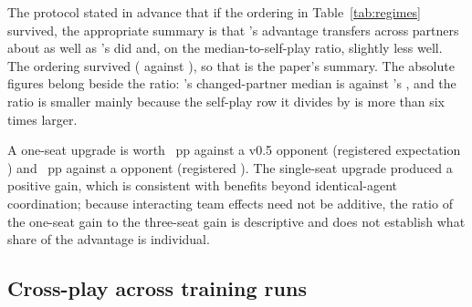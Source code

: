 \begin{table}[!ht]\centering
\caption{Partner-regime table against a \vsix{} opponent. Per-bank values are given in bank order,
7090001 then 7090002.}
\label{tab:partnerssix}
{\tabfont}
\end{table}

\begin{table}[!ht]\centering
\caption{Transfer across partners: \sestina{} over \vsix{} against \vsix{} over v0.5, on the same
eight settings and the same banks. The two training rows are quoted from the registered
protocol; the protocol records that its v0.6-over-v0.5
training row is computed on three of seven changed settings, so that row is not directly comparable
with the holdout row above it. Reported and not gated.}
\label{tab:regimes}
{\tabfont}
\end{table}

The protocol stated in advance that if the ordering in Table~\ref{tab:regimes} survived, the
appropriate summary is that \sestina{}'s advantage transfers across partners about as well as
\vsix{}'s did and, on the median-to-self-play ratio, slightly less well. The ordering survived
(\vsevenSoneRatio{} against \vsevenBaseRatio{}), so that is the paper's summary. The absolute
figures belong beside the ratio: \sestina{}'s changed-partner median is \vsevenSoneMedian{}
against \vsix{}'s \vsevenBaseMedian{}, and the ratio is smaller mainly because the self-play row it
divides by is more than six times larger.

A one-seat upgrade is worth \vsevenOneSeatFive{}~pp against a v0.5 opponent (registered expectation
\vsevenTrainOneSeatFive{}) and \vsevenOneSeatSix{}~pp against a \vsix{} opponent (registered
\vsevenTrainOneSeatSix{}). The single-seat upgrade produced a positive gain, which is consistent
with benefits beyond identical-agent coordination; because interacting team effects need not be
additive, the ratio of the one-seat gain to the three-seat gain is descriptive and does not
establish what share of the advantage is individual.

\subsection{Cross-play across training runs}
\label{sec:results-crossplay}

